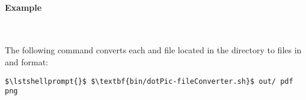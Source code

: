 \setTextListing


\paragraph*{Example}\

\noindent The following command converts each  and  file located in the %
directory  to files in  and  format:

\setTextListing
\begin{lstlisting}
$\lstshellprompt{}$ $\textbf{bin/dotPic-fileConverter.sh}$ out/ pdf png
\end{lstlisting}